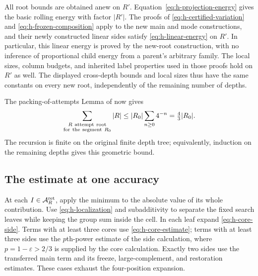 All root bounds are obtained anew on \(R'\).
Equation~\eqref{eq:h-projection-energy} gives the basic rolling
energy with factor \(|R'|\).  The proofs of
\eqref{eq:h-certified-variation} and
\eqref{eq:h-frozen-composition} apply to the new main and mode
constructions, and their newly constructed linear sides satisfy
\eqref{eq:h-linear-energy} on \(R'\).  In particular, this
linear energy is proved by the new-root construction, with no
inference of proportional child energy from a parent's arbitrary
family.  The local sizes, column budgets, and inherited label
properties used in those proofs hold on \(R'\) as well.  The displayed
cross-depth bounds and local sizes thus have the same constants on
every new root, independently of the remaining number of depths.

The packing-of-attempts Lemma of \cite[Section~3]{H} now gives
\[
 \sum_{\substack{R\ {\rm attempt\ root}\\
                  {\rm for\ the\ segment}\ R_0}}|R|
 \le |R_0|\sum_{n\ge0}4^{-n}=\tfrac43|R_0|.
\]
The recursion is finite on the original finite depth tree;
equivalently, induction on the remaining depths gives this
geometric bound.

\subsection{The estimate at one accuracy}

At each \(I\in\mathcal A_R^{\rm ret}\), apply the minimum to the
absolute value of its whole contribution.  Use
\eqref{eq:h-localization} and subadditivity to separate the fixed
search leaves while keeping the group sum inside the cell.
In each leaf expand \eqref{eq:h-core-side}.  Terms with at least
three cores use \eqref{eq:h-core-estimate}; terms with at least
three sides use the \(p\)th-power estimate of the side calculation,
where \(p=1-\varepsilon>2/3\) is supplied by the core calculation.
Exactly two sides use the transferred main term and its freeze,
large-complement, and restoration estimates.  These cases exhaust
the four-position expansion.

